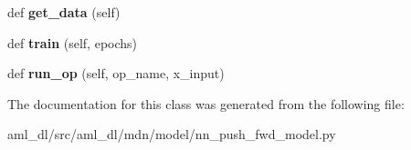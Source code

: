 \begin{DoxyCompactItemize}
def {\bfseries get\+\_\+data} (self)
\item 
\hypertarget{classsrc_1_1aml__dl_1_1mdn_1_1model_1_1nn__push__fwd__model_1_1_n_n_push_fwd_model_a2a28c60e16552d4c98bf3a3d888e2837}{}\label{classsrc_1_1aml__dl_1_1mdn_1_1model_1_1nn__push__fwd__model_1_1_n_n_push_fwd_model_a2a28c60e16552d4c98bf3a3d888e2837} 
def {\bfseries train} (self, epochs)
\item 
\hypertarget{classsrc_1_1aml__dl_1_1mdn_1_1model_1_1nn__push__fwd__model_1_1_n_n_push_fwd_model_a91dfe860df5e0a8414f473e4ea5c75ab}{}\label{classsrc_1_1aml__dl_1_1mdn_1_1model_1_1nn__push__fwd__model_1_1_n_n_push_fwd_model_a91dfe860df5e0a8414f473e4ea5c75ab} 
def {\bfseries run\+\_\+op} (self, op\+\_\+name, x\+\_\+input)
\end{DoxyCompactItemize}


The documentation for this class was generated from the following file\+:\begin{DoxyCompactItemize}
\item 
aml\+\_\+dl/src/aml\+\_\+dl/mdn/model/nn\+\_\+push\+\_\+fwd\+\_\+model.\+py\end{DoxyCompactItemize}
